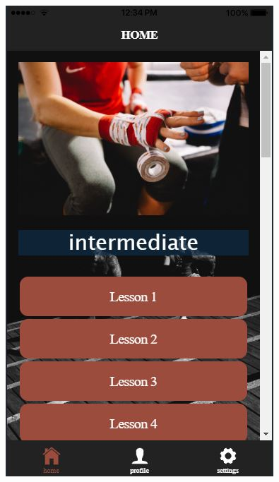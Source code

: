 \documentclass[a4paper,12pt]{article}
\begin{document}
\begin{figure}[!htb]
				\endminipage\hfill
				  \includegraphics[width=\linewidth]{home2}
				

\end{figure}
\end{document}
